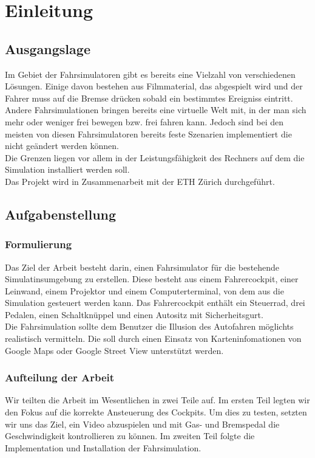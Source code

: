 \section{Einleitung}

\subsection{Ausgangslage}
Im Gebiet der Fahrsimulatoren gibt es bereits eine Vielzahl von verschiedenen Lösungen. Einige davon bestehen aus Filmmaterial, das abgespielt wird und der Fahrer muss auf die Bremse drücken sobald ein bestimmtes Ereigniss eintritt. Andere Fahrsimulationen bringen bereits eine virtuelle Welt mit, in der man sich mehr oder weniger frei bewegen bzw. frei fahren kann. Jedoch sind bei den meisten von diesen Fahrsimulatoren bereits feste Szenarien implementiert die  nicht geändert werden können.\\
Die Grenzen liegen vor allem in der Leistungsfähigkeit des Rechners auf dem die Simulation installiert werden soll.\\
Das Projekt wird in Zusammenarbeit mit der ETH Zürich durchgeführt. 


\subsection{Aufgabenstellung}
\subsubsection{Formulierung}
Das Ziel der Arbeit besteht darin, einen Fahrsimulator für die bestehende Simulatinsumgebung zu erstellen. Diese besteht aus einem Fahrercockpit, einer Leinwand, einem Projektor und einem Computerterminal, von dem aus die Simulation gesteuert werden kann. Das Fahrercockpit enthält ein Steuerrad, drei Pedalen, einen Schaltknüppel und einen Autositz mit Sicherheitsgurt.\\
Die Fahrsimulation sollte dem Benutzer die Illusion des Autofahren möglichts realistisch vermitteln. Die soll durch einen Einsatz von Karteninfomationen von Google Maps oder Google Street View unterstützt werden. 

\subsubsection{Aufteilung der Arbeit}
Wir teilten die Arbeit im Wesentlichen in zwei Teile auf. Im ersten Teil legten wir den Fokus auf die korrekte Ansteuerung des Cockpits. Um dies zu testen, setzten wir uns das Ziel, ein Video abzuspielen und mit Gas- und Bremspedal die Geschwindigkeit kontrollieren zu können. Im zweiten Teil folgte die Implementation und Installation der Fahrsimulation.